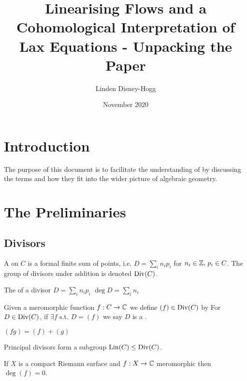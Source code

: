 \documentclass{article}
\title{Linearising Flows and a Cohomological Interpretation of Lax Equations - Unpacking the Paper}
\author{Linden Disney-Hogg}
\date{November 2020}
\begin{document}
\maketitle
\tableofcontents

\section{Introduction}
The purpose of this document is to facilitate the understanding of \cite{Griffiths1985} by discussing the terms and how they fit into the wider picture of algebraic geometry. 
\section{The Preliminaries}

\subsection{Divisors}
\begin{definition}
	A  on $C$ is a formal finite sum of points, i.e. $D = \sum_i n_i p_i$ for $n_i \in \mathbb{Z}, \, p_i \in C$. The group of divisors under addition is denoted $\operatorname{Div}(C)$. 
\end{definition}

\begin{definition}
	The  of a divisor $D = \sum_i n_i p_i$ $\deg D = \sum_i n_i $
\end{definition}

\begin{definition}
	Given a meromorphic function $f:C \to \mathbb{C}$ we define $(f) \in \operatorname{Div}(C)$ by 
For $D \in \operatorname{Div}(C)$, if $\exists f$ s.t. $D=(f)$ we say $D$ is a . 
\end{definition}

\begin{lemma}$(fg) = (f)+(g)$
\end{lemma}
\begin{corollary}
	Principal divisors form a subgroup  $\operatorname{Lin}(C) \leq \operatorname{Div}(C)$. 
\end{corollary}

\begin{lemma}
	If $X$ is a compact Riemann surface and $f:X \to \mathbb{C}$ meromorphic then $\deg(f) = 0$. 
\end{lemma}
\end{document}
